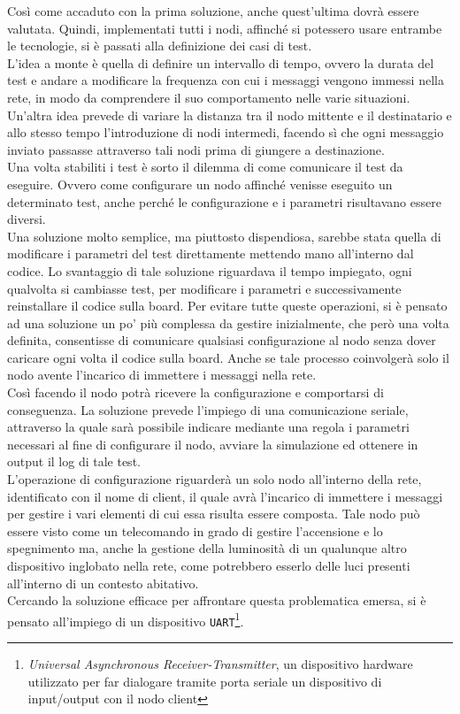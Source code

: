 \noindent Così come accaduto con la prima soluzione, anche quest'ultima dovrà essere valutata. Quindi, implementati tutti i nodi, affinché si potessero usare entrambe le tecnologie, si è passati alla definizione dei casi di test.\\
L'idea a monte è quella di definire un intervallo di tempo, ovvero la durata del test e andare a modificare la frequenza con cui i messaggi vengono immessi nella rete, in modo da comprendere il suo comportamento nelle varie situazioni. 
Un'altra idea prevede di variare la distanza tra il nodo mittente e il destinatario e allo stesso tempo l'introduzione di nodi intermedi, facendo sì che ogni messaggio inviato passasse attraverso tali nodi prima di giungere a destinazione.\\
Una volta stabiliti i test è sorto il dilemma di come comunicare il test da eseguire. Ovvero come configurare un nodo affinché venisse eseguito un determinato test, anche perché le configurazione e i parametri risultavano essere diversi.\\
Una soluzione molto semplice, ma piuttosto dispendiosa, sarebbe stata quella di modificare i parametri del test direttamente mettendo mano all'interno dal codice. Lo svantaggio di tale soluzione riguardava il tempo impiegato, ogni qualvolta si cambiasse test, per modificare i parametri e successivamente reinstallare il codice sulla board. Per evitare tutte queste operazioni, si è pensato ad una soluzione un po' più complessa da gestire inizialmente, che però una volta definita, consentisse di comunicare qualsiasi configurazione al nodo senza dover caricare ogni volta il codice sulla board. Anche se tale processo coinvolgerà solo il nodo avente l'incarico di immettere i messaggi nella rete.\\
Così facendo il nodo potrà ricevere la configurazione e comportarsi di conseguenza. La soluzione prevede l'impiego di una comunicazione seriale, attraverso la quale sarà possibile indicare mediante una regola i parametri necessari al fine di configurare il nodo, avviare la simulazione ed ottenere in output il log di tale test.\\
L'operazione di configurazione riguarderà un solo nodo all'interno della rete, identificato con il nome di client, il quale avrà l'incarico di immettere i messaggi per gestire i vari elementi di cui essa risulta essere composta. Tale nodo può essere visto come un telecomando in grado di gestire l'accensione e lo spegnimento ma, anche la gestione della luminosità di un qualunque altro dispositivo inglobato nella rete, come potrebbero esserlo delle luci presenti all'interno di un contesto abitativo.\\
Cercando la soluzione efficace per affrontare questa problematica emersa, si è pensato all'impiego di un dispositivo \texttt{UART}\footnote{\textit{Universal Asynchronous Receiver-Transmitter}, un dispositivo hardware utilizzato per far dialogare tramite porta seriale un dispositivo di input/output con il nodo client}.

